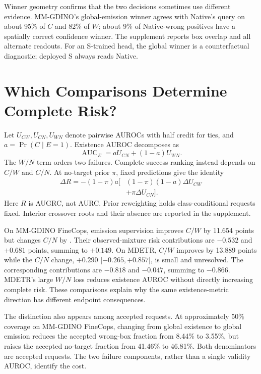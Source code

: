 \documentclass[10pt,twocolumn,letterpaper]{article}
\begin{document}
Winner geometry confirms that the two decisions sometimes use different
evidence. MM-GDINO's global-emission winner agrees with Native's query
on about 95\% of $C$ and 82\% of $W$; about 9\% of Native-wrong
positives have a spatially correct confidence winner. The supplement
reports box overlap and all alternate readouts. For an S-trained head,
the global winner is a counterfactual diagnostic; deployed S always
reads Native.

\section{Which Comparisons Determine Complete Risk?}

Let $U_{CW},U_{CN},U_{WN}$ denote pairwise AUROCs with half credit
for ties, and $a=\Pr(C\mid E=1)$. Existence AUROC decomposes as
\begin{equation}
\operatorname{AUC}_E=aU_{CN}+(1-a)U_{WN}.
\end{equation}
The $W/N$ term orders two failures. Complete success ranking instead
depends on $C/W$ and $C/N$. At no-target prior $\pi$, fixed predictions
give the identity
\begin{align}
\Delta R=-(1-\pi)a\big[&(1-\pi)(1-a)\Delta U_{CW}\nonumber\\
 &+\pi\Delta U_{CN}\big].\label{eq:augrc}
\end{align}
Here $R$ is AUGRC, not AURC. Prior reweighting holds class-conditional
requests fixed. Interior crossover roots and their absence are reported
in the supplement.

On MM-GDINO FineCops, emission supervision improves $C/W$ by 11.654
points but changes $C/N$ by \AllCN{}. Their observed-mixture risk
contributions are $-0.532$ and $+0.681$ points, summing to $+0.149$.
On MDETR, $C/W$ improves by 13.889 points while the $C/N$ change,
$+0.290$ [$-0.265,+0.857$], is small and unresolved. The corresponding
contributions are $-0.818$ and $-0.047$, summing to $-0.866$.
MDETR's large $W/N$ loss reduces existence AUROC without directly
increasing complete risk. These comparisons explain why the same
existence-metric direction has different endpoint consequences.

The distinction also appears among accepted requests. At approximately
50\% coverage on MM-GDINO FineCops, changing from global existence to
global emission reduces the accepted wrong-box fraction from 8.44\% to
3.55\%, but raises the accepted no-target fraction from 41.46\% to
46.81\%. Both denominators are accepted requests. The two failure
components, rather than a single validity AUROC, identify the cost.
\end{document}
